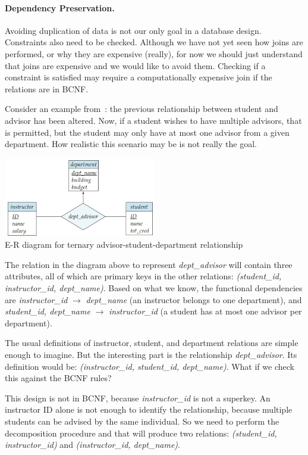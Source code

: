 \paragraph{Dependency Preservation.} Avoiding duplication of data is not our only goal in a database design. Constraints also need to be checked. Although we have not yet seen how joins are performed, or why they are expensive (really), for now we should just understand that joins are expensive and we would like to avoid them. Checking if a constraint is satisfied may require a computationally expensive join if the relations are in BCNF.

Consider an example from~\cite{dsc}: the previous relationship between student and advisor has been altered. Now, if a student wishes to have multiple advisors, that is permitted, but the student may only have at most one advisor from a given department. How realistic this scenario may be is not really the goal.

\begin{center}
\includegraphics[width=0.5\textwidth]{images/advise-3}\\
E-R diagram for ternary advisor-student-department relationship~\cite{dsc}
\end{center}

The relation in the diagram above to represent \textit{dept\_advisor} will contain three attributes, all of which are primary keys in the other relations: \textit{(student\_id, instructor\_id, dept\_name)}. Based on what we know, the functional dependencies are \textit{instructor\_id} $\rightarrow$ \textit{dept\_name} (an instructor belongs to one department), and \textit{student\_id, dept\_name} $\rightarrow$ \textit{instructor\_id} (a student has at most one advisor per department). 

The usual definitions of instructor, student, and department relations are simple enough to imagine. But the interesting part is the relationship \textit{dept\_advisor}. Its definition would be: \textit{(instructor\_id, student\_id, dept\_name)}. What if we check this against the BCNF rules?

This design is not in BCNF, because \textit{instructor\_id} is not a superkey. An instructor ID alone is not enough to identify the relationship, because multiple students can be advised by the same individual. So we need to perform the decomposition procedure and that will produce two relations: \textit{(student\_id, instructor\_id)} and \textit{(instructor\_id, dept\_name)}.

